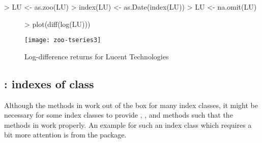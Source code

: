 \documentclass{Z}
\begin{document}
\begin{Schunk}
\begin{Sinput}
> LU <- as.zoo(LU)
> index(LU) <- as.Date(index(LU))
> LU <- na.omit(LU)
\end{Sinput}
\end{Schunk}

\begin{figure}
\begin{center}
\begin{Schunk}
\begin{Sinput}
> plot(diff(log(LU)))
\end{Sinput}
\end{Schunk}
\texttt{[image: zoo-tseries3]}
\caption{\label{fig:tseries} Log-difference returns for Lucent Technologies}
\end{center}
\end{figure}


\subsection[fBasics: indexes of class "timeDate"]{: indexes of class }

Although the methods in  work out of the box for many index classes,
it might be necessary for some index classes to provide , ,
 and  methods such that the methods in  
work properly. An example for such an index class which requires a bit more
attention is  from the  package.
\end{document}
